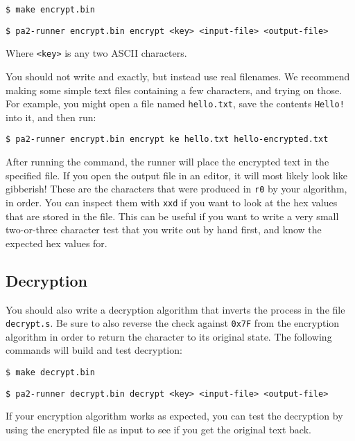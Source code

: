 \documentclass{article}
\def\r#1{\texttt{r#1}}
\begin{document}
\begin{verbatim}
$ make encrypt.bin
\end{verbatim}

\begin{verbatim}
$ pa2-runner encrypt.bin encrypt <key> <input-file> <output-file>
\end{verbatim}

Where {\tt <key>} is any two ASCII characters.

You should not write {\tt <input-file>} and {\tt <output-file>} exactly, but
instead use real filenames. We recommend making some simple text files
containing a few characters, and trying on those. For example, you might open a
file named {\tt hello.txt}, save the contents {\tt Hello!} into it, and then
run:

\begin{verbatim}
$ pa2-runner encrypt.bin encrypt ke hello.txt hello-encrypted.txt
\end{verbatim}

After running the command, the runner will place the encrypted text in the
specified file. If you open the output file in an editor, it will most likely
look like gibberish! These are the characters that were produced in \r{0} by
your algorithm, in order. You can inspect them with {\tt xxd} if you want to
look at the hex values that are stored in the file. This can be useful if you
want to write a very small two-or-three character test that you write out by
hand first, and know the expected hex values for.

\subsection{Decryption}

You should also write a decryption algorithm that inverts the process in the
file \texttt{decrypt.s}. Be sure to also reverse the check against {\tt 0x7F} 
from the encryption algorithm in order to return the character to its original
state. The following commands will build and test decryption:

\begin{verbatim}
$ make decrypt.bin
\end{verbatim}

\begin{verbatim}
$ pa2-runner decrypt.bin decrypt <key> <input-file> <output-file>
\end{verbatim}

If your encryption algorithm works as expected, you can test the decryption by
using the encrypted file as input to see if you get the original text back.
\end{document}
